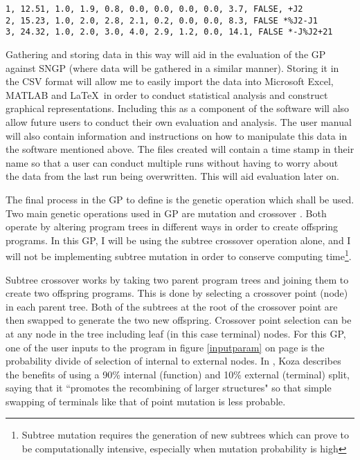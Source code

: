 \documentclass[a4paper,10.5pt]{article}
\begin{document}
\begin{lstlisting}
1, 12.51, 1.0, 1.9, 0.8, 0.0, 0.0, 0.0, 0.0, 3.7, FALSE, +J2
2, 15.23, 1.0, 2.0, 2.8, 2.1, 0.2, 0.0, 0.0, 8.3, FALSE *%J2-J1
3, 24.32, 1.0, 2.0, 3.0, 4.0, 2.9, 1.2, 0.0, 14.1, FALSE *-J%J2+21
\end{lstlisting}

\begin{text}
Gathering and storing data in this way will aid in the evaluation of the GP against SNGP (where data will be gathered in a similar manner). Storing it in the CSV format will allow me to easily import the data into Microsoft Excel, MATLAB and \LaTeX \ in order to conduct statistical analysis and construct graphical representations. Including this as a component of the software will also allow future users to conduct their own evaluation and analysis. The user manual will also contain information and instructions on how to manipulate this data in the software mentioned above. The files created will contain a time stamp in their name so that a user can conduct multiple runs without having to worry about the data from the last run being overwritten. This will aid evaluation later on.
\end{text}

The final process in the GP to define is the genetic operation which shall be used. Two main genetic operations used in GP are mutation and crossover \cite[p.15-17]{introgp}. Both operate by altering program trees in different ways in order to create offspring programs. In this GP, I will be using the subtree crossover operation alone, and I will not be implementing subtree mutation in order to conserve computing time\footnote{Subtree mutation requires the generation of new subtrees which can prove to be computationally intensive, especially when mutation probability is high}.  

Subtree crossover works by taking two parent program trees and joining them to create two offspring programs. This is done by selecting a crossover point (node) in each parent tree. Both of the subtrees at the root of the crossover point are then swapped to generate the two new offspring. Crossover point selection can be at any node in the tree including leaf (in this case terminal) nodes. For this GP, one of the user inputs to the program in figure \ref{inputparam} on page \pageref{inputparam} is the probability divide of selection of internal to external nodes. In \cite[p.114]{kozagpbook}, Koza describes the benefits of using a 90\% internal (function) and 10\% external (terminal) split, saying that it ``promotes the recombining of larger structures" so that simple swapping of terminals like that of point mutation is less probable.
\end{document}
